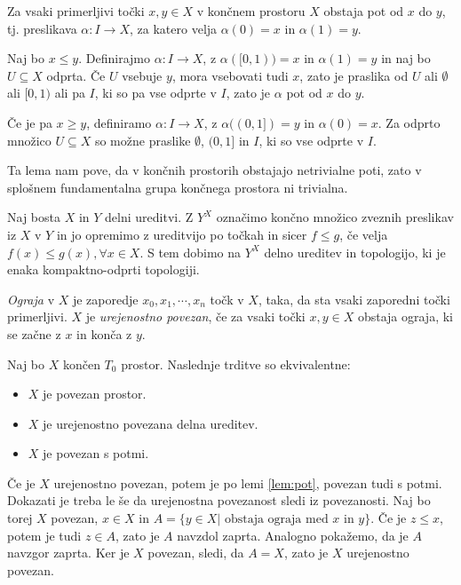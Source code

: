 \documentclass[mat1]{fmfdelo}
\begin{document}
\begin{lema}
    Za vsaki primerljivi točki $x,y\in X$ v končnem prostoru $X$ obstaja pot od $x$ do $y$, tj. preslikava $\alpha\colon  I \rightarrow X$, za katero velja $\alpha(0)=x$ in $\alpha(1)=y$.
\label{lem:pot}
\end{lema}
\begin{dokaz}
    Naj bo $x \leq y$. Definirajmo $\alpha\colon I\rightarrow X$, z $\alpha([0,1))=x$ in $\alpha(1)=y$ in naj bo $U \subseteq X$ odprta. Če $U$ vsebuje $y$, mora vsebovati tudi $x$, 
    zato je praslika od $U$ ali $\emptyset$ ali $[0,1)$ ali pa $I$, ki so pa vse odprte v $I$, zato je $\alpha$ pot od $x$ do $y$.

    Če je pa $x \geq y$, definiramo $\alpha\colon I\rightarrow X$, z $\alpha((0,1])=y$ in $\alpha(0)=x$. Za odprto množico $U\subseteq X$ so možne praslike $\emptyset$, $(0,1]$ in $I$, ki so vse odprte v $I$.
\end{dokaz}
Ta lema nam pove, da v končnih prostorih obstajajo netrivialne poti, zato v splošnem fundamentalna grupa končnega prostora ni trivialna.

Naj bosta $X$ in $Y$ delni ureditvi. Z $Y^X$ označimo končno množico zveznih preslikav iz $X$ v $Y$ in jo opremimo z ureditvijo po točkah in sicer $f\leq g$, če velja $f(x) \leq g(x), \forall x\in X$. S tem dobimo na $Y^X$ delno ureditev in topologijo, ki je enaka kompaktno-odprti topologiji.  %

\textit{Ograja} v $X$ je zaporedje $x_0,x_1, \cdots ,x_n$ točk v $X$, taka, da sta vsaki zaporedni točki primerljivi. $X$ je \textit{urejenostno povezan}, če za vsaki točki $x,y\in X$ obstaja ograja, ki se začne z $x$ in konča z $y$.
\begin{lema}
    Naj bo $X$ končen $T_0$ prostor. Naslednje trditve so ekvivalentne:

    \begin{itemize}
        \item $X$ je povezan prostor.
        \item $X$ je urejenostno povezana delna ureditev.
        \item $X$ je povezan s potmi.
    \end{itemize}
    \label{lem:povezanost}
\end{lema}


\begin{dokaz}
    Če je $X$ urejenostno povezan, potem je po lemi \ref{lem:pot}, povezan tudi s potmi.
    Dokazati je treba le še da urejenostna povezanost sledi iz povezanosti. Naj bo torej $X$ povezan, $x\in X$ in $A=\{y\in X| \text{ obstaja ograja med $x$ in $y$}\}$. Če 
    je $z\leq x$, potem je tudi $z\in A$, zato je $A$ navzdol zaprta. Analogno pokažemo, da je $A$ navzgor zaprta. Ker je $X$ povezan, sledi, da $A=X$, zato je $X$ urejenostno povezan.
\end{dokaz}
\end{document}

